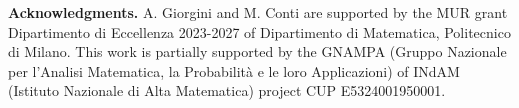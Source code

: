 \documentclass[11pt,reqno]{amsart}
\theoremstyle{remark}
\def\d{{\rm d}}
\numberwithin{equation}{section}
\def\d{{\rm d}}
\newcommand{\vp}{\phi}
\begin{document}
%
%
%
%
%
%







\bigskip

\noindent
\textbf{Acknowledgments.}
A. Giorgini and M. Conti are supported by the MUR grant Dipartimento di Eccellenza 2023-2027 of Dipartimento di Matematica, Politecnico di Milano.
This work is partially supported by the GNAMPA (Gruppo Nazionale per l'Analisi Ma\-te\-ma\-ti\-ca, la Probabilit\`{a} e le loro Applicazioni) of INdAM (Istituto Nazionale di Alta Matematica) project CUP E5324001950001. 
\end{document}
